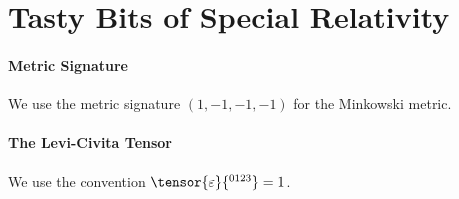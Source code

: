 \section{Tasty Bits of Special Relativity}

\paragraph{Metric Signature}
We use the metric signature $(1, -1, -1, -1)$ for the Minkowski metric.

\paragraph{The Levi-Civita Tensor}
We use the convention $\tensor{\varepsilon}{^{0123}} = 1$.